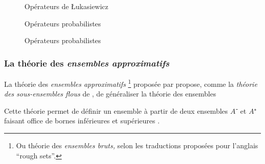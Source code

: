 \begin{figure}
  \begin{center}
    \caption{Opérateurs de Łukasiewicz}
    \label{fig:luka_op}
  \end{center}
\end{figure}

\begin{figure}
  \begin{center}
    \caption{Opérateurs probabilistes}
    \label{fig:prob_op}
  \end{center}
\end{figure}

\begin{figure}
  \begin{center}
    \caption{Opérateurs probabilistes}
    \label{fig:drast_op}
  \end{center}
\end{figure}

\subsubsection{La théorie des \emph{ensembles approximatifs}}


La théorie des \emph{ensembles approximatifs} \footnote{Ou théorie des
  \emph{ensembles bruts,} selon les traductions proposées pour
  l'anglais \enquote{rough sets}.} proposée par \textcite{Pawlak1982}
propose, comme la \emph{théorie des sous-ensembles flous} de
\textcite{Zadeh1965}, de généraliser la théorie des ensembles

Cette théorie permet de définir un ensemble à partir de deux ensembles
$A⁻$ et $A⁺$ faisant office de bornes inférieures et supérieures
\autocite{Gacogne1997}.

